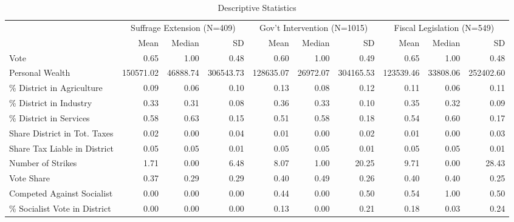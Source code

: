 \begin{table}

\caption{\label{tab:descriptives_all}Descriptive Statistics}
\centering
\begin{tabular}[t]{lrrrrrrrrr}
\toprule
\multicolumn{1}{c}{ } & \multicolumn{3}{c}{Suffrage Extension (N=409)} & \multicolumn{3}{c}{Gov't Intervention (N=1015)} & \multicolumn{3}{c}{Fiscal Legislation (N=549)} \\
\cmidrule(l{3pt}r{3pt}){2-4} \cmidrule(l{3pt}r{3pt}){5-7} \cmidrule(l{3pt}r{3pt}){8-10}
  & Mean & Median & SD & Mean  & Median  & SD  & Mean   & Median   & SD  \\
\midrule
Vote & \num{0.65} & \num{1.00} & \num{0.48} & \num{0.60} & \num{1.00} & \num{0.49} & \num{0.65} & \num{1.00} & \num{0.48}\\
Personal Wealth & \num{150571.02} & \num{46888.74} & \num{306543.73} & \num{128635.07} & \num{26972.07} & \num{304165.53} & \num{123539.46} & \num{33808.06} & \num{252402.60}\\
\% District in Agriculture & \num{0.09} & \num{0.06} & \num{0.10} & \num{0.13} & \num{0.08} & \num{0.12} & \num{0.11} & \num{0.06} & \num{0.11}\\
\% District in Industry & \num{0.33} & \num{0.31} & \num{0.08} & \num{0.36} & \num{0.33} & \num{0.10} & \num{0.35} & \num{0.32} & \num{0.09}\\
\% District in Services & \num{0.58} & \num{0.63} & \num{0.15} & \num{0.51} & \num{0.58} & \num{0.18} & \num{0.54} & \num{0.60} & \num{0.17}\\
Share District in Tot. Taxes & \num{0.02} & \num{0.00} & \num{0.04} & \num{0.01} & \num{0.00} & \num{0.02} & \num{0.01} & \num{0.00} & \num{0.03}\\
Share Tax Liable in District & \num{0.05} & \num{0.05} & \num{0.01} & \num{0.05} & \num{0.05} & \num{0.01} & \num{0.05} & \num{0.05} & \num{0.01}\\
Number of Strikes & \num{1.71} & \num{0.00} & \num{6.48} & \num{8.07} & \num{1.00} & \num{20.25} & \num{9.71} & \num{0.00} & \num{28.43}\\
Vote Share & \num{0.37} & \num{0.29} & \num{0.29} & \num{0.40} & \num{0.49} & \num{0.26} & \num{0.40} & \num{0.40} & \num{0.25}\\
Competed Against Socialist & \num{0.00} & \num{0.00} & \num{0.00} & \num{0.44} & \num{0.00} & \num{0.50} & \num{0.54} & \num{1.00} & \num{0.50}\\
\% Socialist Vote in District & \num{0.00} & \num{0.00} & \num{0.00} & \num{0.13} & \num{0.00} & \num{0.21} & \num{0.18} & \num{0.03} & \num{0.24}\\

\end{tabular}
\end{table}
